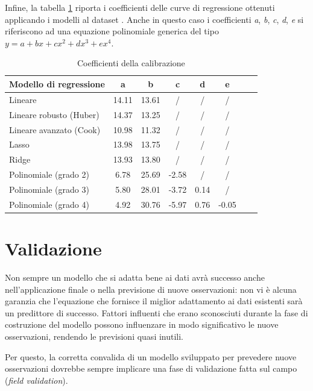 \clearpage

Infine, la tabella \ref{fig:risultati-pm10-coefficienti} riporta i coefficienti delle curve di regressione ottenuti applicando i modelli al dataset . Anche in questo caso i coefficienti \textit{a}, \textit{b}, \textit{c}, \textit{d}, \textit{e} si riferiscono ad una equazione polinomiale generica del tipo $y=a+bx+cx^2+dx^3+ex^4$.

\begin{table}[H]
    \footnotesize
    \centering
    \begin{tabular}{|l|c|c|c|c|c|c|c|}
    \hline
        \textbf{Modello di regressione} & \textbf{a} & \textbf{b} & \textbf{c} & \textbf{d} & \textbf{e} \\ \hline
        Lineare & 14.11 & 13.61 & / & / & / \\ \hline
        Lineare robusto (Huber) & 14.37 & 13.25 & / & / & / \\ \hline
        Lineare avanzato (Cook) & 10.98 & 11.32 & / & / & / \\ \hline
        Lasso & 13.98 & 13.75 & / & / & / \\ \hline
        Ridge & 13.93 & 13.80 & / & / & / \\ \hline
        Polinomiale (grado 2) & 6.78 & 25.69 & -2.58 & / & / \\ \hline
        Polinomiale (grado 3) & 5.80 & 28.01 & -3.72 & 0.14 & / \\ \hline
        Polinomiale (grado 4) & 4.92 & 30.76 & -5.97 & 0.76 & -0.05 \\ \hline
    \end{tabular}
    \caption{Coefficienti della calibrazione }
    \label{fig:risultati-pm10-coefficienti}
\end{table}

\section{Validazione}\label{sec:validazione}
Non sempre un modello che si adatta bene ai dati avrà successo anche nell'applicazione finale o nella previsione di nuove osservazioni: non vi è alcuna garanzia che l'equazione che fornisce il miglior adattamento ai dati esistenti sarà un predittore di successo. Fattori influenti che erano sconosciuti durante la fase di costruzione del modello possono influenzare in modo significativo le nuove osservazioni, rendendo le previsioni quasi inutili.

Per questo, la corretta convalida di un modello sviluppato per prevedere nuove osservazioni dovrebbe sempre implicare una fase di validazione fatta sul campo (\textit{field validation}).


